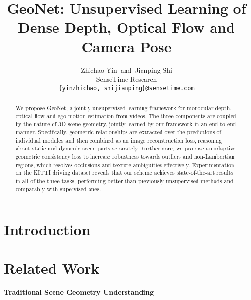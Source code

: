 \documentclass[10pt,twocolumn,letterpaper]{article}
\begin{document}
\title{GeoNet: Unsupervised Learning of Dense Depth, Optical Flow and Camera Pose}

\author{Zhichao Yin~and~Jianping Shi\\
SenseTime Research\\
{\tt\small \{yinzhichao, shijianping\}@sensetime.com}
}

\maketitle

\begin{abstract}
We propose GeoNet, a jointly unsupervised learning framework for monocular depth, optical flow and ego-motion estimation from videos. 
The three components are coupled by the nature of 3D scene geometry, jointly learned by our framework in an end-to-end manner. %
Specifically, geometric relationships are extracted over the predictions of individual modules and then combined as an image reconstruction loss,  reasoning about static and dynamic scene parts separately. Furthermore, we propose an adaptive geometric consistency loss to increase robustness towards outliers and non-Lambertian regions, which resolves occlusions and texture ambiguities effectively. 
Experimentation on the KITTI driving dataset reveals that our scheme achieves state-of-the-art results in all of the three tasks, performing better than previously unsupervised methods and comparably with supervised ones.
\end{abstract}

\section{Introduction}
\label{sec:intro}

\vspace{-1ex}

\section{Related Work}
\label{sec:related}
\paragraph{Traditional Scene Geometry Understanding}%
\end{document}
